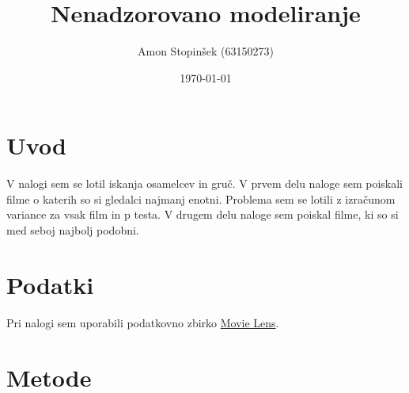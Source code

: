 \documentclass[a4paper,11pt]{article}
\title{Nenadzorovano modeliranje}
\author{Amon Stopinšek (63150273)}
\date{\today}
\begin{document}
\maketitle

\section{Uvod}

V nalogi sem se lotil iskanja osamelcev in gruč. V prvem delu naloge sem
poiskali filme o katerih so si gledalci najmanj enotni. Problema sem se lotili
z izračunom variance za vsak film in p testa. V drugem delu naloge sem poiskal
filme, ki so si med seboj najbolj podobni.

\section{Podatki}


Pri nalogi sem uporabili podatkovno zbirko
\href{https://grouplens.org/datasets/movielens/}{Movie Lens}.

\section{Metode}

%
%
%
%
\end{document}
